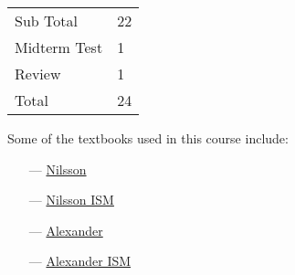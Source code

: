 \begin{longtable}[]{@{}ll@{}}
\toprule
Sub Total & 22\tabularnewline
Midterm Test & 1\tabularnewline
Review & 1\tabularnewline
Total & 24\tabularnewline
\bottomrule
\end{longtable}

Some of the textbooks used in this course include:
\begin{itemize}
	\item[---]  \hyperlink{ref-book:nilEC}{Nilsson}
	\item[---]  \hyperlink{ref-book:nilECSol}{Nilsson ISM}
	\item[---]  \hyperlink{ref-book:alexEC}{Alexander} 
	\item[---]  \hyperlink{ref-book:alexECSol}{Alexander ISM}
\end{itemize}